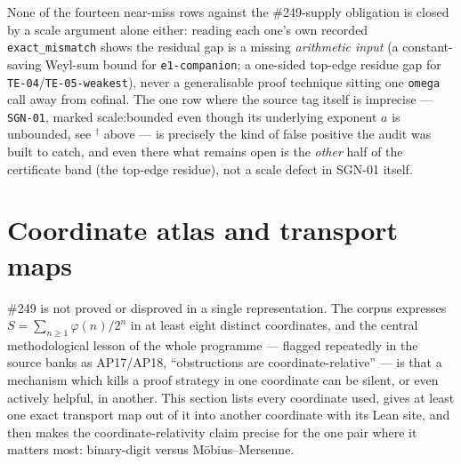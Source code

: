 \documentclass[11pt]{article}
\theoremstyle{plain}
\theoremstyle{definition}
\theoremstyle{remark}
\newcommand{\scale}[1]{{\small\textsf{scale:#1}}\xspace}
\begin{document}
None of the fourteen near-miss rows against the \#249-supply obligation is closed by a scale
argument alone either: reading each one's own recorded \texttt{exact\_mismatch} shows the residual
gap is a missing \emph{arithmetic input} (a constant-saving Weyl-sum bound for
\texttt{e1-companion}; a one-sided top-edge residue gap for \texttt{TE-04}/\texttt{TE-05-weakest}), never a
generalisable proof technique sitting one \texttt{omega} call away from cofinal. The one row where
the source tag itself is imprecise — \texttt{SGN-01}, marked \scale{bounded} even though its
underlying exponent $a$ is unbounded, see $^\dagger$ above — is precisely the kind of false
positive the audit was built to catch, and even there what remains open is the \emph{other} half of
the certificate band (the top-edge residue), not a scale defect in SGN-01 itself.

\section{Coordinate atlas and transport maps}

\#249 is not proved or disproved in a single representation. The corpus expresses
$S=\sum_{n\ge1}\varphi(n)/2^n$ in at least eight distinct coordinates, and the central
methodological lesson of the whole programme — flagged repeatedly in the source banks as
AP17/AP18, ``obstructions are coordinate-relative'' — is that a mechanism which kills a proof
strategy in one coordinate can be silent, or even actively helpful, in another. This section lists
every coordinate used, gives at least one exact transport map out of it into another coordinate
with its Lean site, and then makes the coordinate-relativity claim precise for the one pair where
it matters most: binary-digit versus M\"obius--Mersenne.
\end{document}

